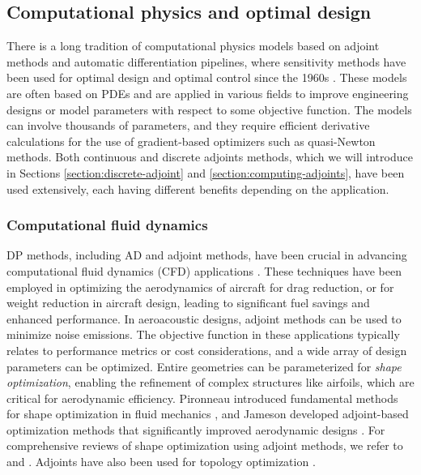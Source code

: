 
\subsection{Computational physics and optimal design}

There is a long tradition of computational physics models based on adjoint methods and automatic differentiation pipelines, where sensitivity methods have been used for optimal design and optimal control since the 1960s \cite{lions1971optimal}. 
These models are often based on PDEs and are applied in various fields to improve engineering designs or model parameters with respect to some objective function. 
The models can involve thousands of parameters, and they require efficient derivative calculations for the use of gradient-based optimizers such as quasi-Newton methods. 
Both continuous and discrete adjoints methods, which we will introduce in Sections \ref{section:discrete-adjoint} and \ref{section:computing-adjoints}, have been used extensively, each having different benefits depending on the application.

\subsubsection{Computational fluid dynamics}

DP methods, including AD and adjoint methods, have been crucial in advancing computational fluid dynamics (CFD) applications \cite{KENWAY2019100542}. 
These techniques have been employed in optimizing the aerodynamics of aircraft for drag reduction, or for weight reduction in aircraft design, leading to significant fuel savings and enhanced performance. 
In aeroacoustic designs, adjoint methods can be used to minimize noise emissions. 
The objective function in these applications typically relates to performance metrics or cost considerations, and a wide array of design parameters can be optimized.
Entire geometries can be parameterized for \emph{shape optimization}, enabling the refinement of complex structures like airfoils, which are critical for aerodynamic efficiency. 
Pironneau introduced fundamental methods for shape optimization in fluid mechanics \cite{Pironneau_1974}, and Jameson developed adjoint-based optimization methods that significantly improved aerodynamic designs \cite{Jameson_1988}. 
For comprehensive reviews of shape optimization using adjoint methods, we refer to \cite{Giles_Pierce_2000} and \cite{mohammadi2009applied}. 
Adjoints have also been used for topology optimization \cite{allaire2014shape}.

